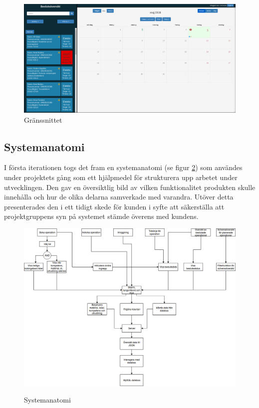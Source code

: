 \clearpage

\begin{figure}
  \includegraphics[width=\linewidth]{Figures/window.png}
  \caption{Gränssnittet}
  \label{fig:window}
\end{figure}


\subsection{Systemanatomi}
I första iterationen togs det fram en systemanatomi (se figur \ref{fig:Systemanatomi}) som användes under projektets gång som ett hjälpmedel för strukturera upp arbetet under utvecklingen. Den gav en översiktlig bild av vilken funktionalitet produkten skulle innehålla och hur de olika delarna samverkade med varandra. Utöver detta presenterades den i ett tidigt skede för kunden i syfte att säkerställa att projektgruppens syn på systemet stämde överens med kundens.

\begin{figure}[H]
    \includegraphics[width=\textwidth,height=.4\textheight]{Figures/Systemanatomi.png}\\
    \caption{Systemanatomi}
    \label{fig:Systemanatomi}
\end{figure}

